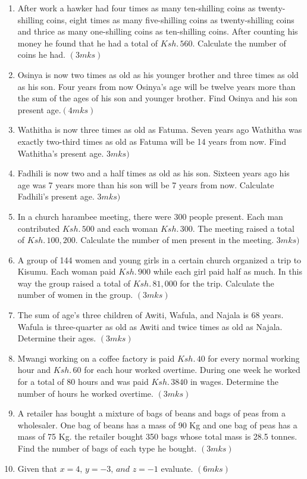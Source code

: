 \documentclass[
  a4paperpaper,
]{scrbook}
\begin{document}
\begin{tcolorbox}
\begin{enumerate}
\def\labelenumi{\arabic{enumi}.}
\setcounter{enumi}{11}
\item
  After work a hawker had four times as many ten-shilling coins as
  twenty-shilling coins, eight times as many five-shilling coins as
  twenty-shilling coins and thrice as many one-shilling coins as
  ten-shilling coins. After counting his money he found that he had a
  total of \(Ksh.\, 560\). Calculate the number of coins he had.
  \((3mks)\)
\item
  Osinya is now two times as old as his younger brother and three times
  as old as his son. Four years from now Osinya's age will be twelve
  years more than the sum of the ages of his son and younger brother.
  Find Osinya and his son present age.\((4mks)\)
\item
  Wathitha is now three times as old as Fatuma. Seven years ago Wathitha
  was exactly two-third times as old as Fatuma will be 14 years from
  now. Find Wathitha's present age. \(3mks)\)
\item
  Fadhili is now two and a half times as old as his son. Sixteen years
  ago his age was 7 years more than his son will be 7 years from now.
  Calculate Fadhili's present age. \(3mks)\)
\item
  In a church harambee meeting, there were 300 people present. Each man
  contributed \(Ksh. \,500\) and each woman \(Ksh.\, 300\). The meeting
  raised a total of \(Ksh.\, 100,200\). Calculate the number of men
  present in the meeting. \(3mks)\)
\item
  A group of 144 women and young girls in a certain church organized a
  trip to Kisumu. Each woman paid \(Ksh. \,900\) while each girl paid
  half as much. In this way the group raised a total of
  \(Ksh.\, 81,000\) for the trip. Calculate the number of women in the
  group. \((3mks)\)
\item
  The sum of age's three children of Awiti, Wafula, and Najala is 68
  years. Wafula is three-quarter as old as Awiti and twice times as old
  as Najala. Determine their ages. \((3mks)\)
\item
  Mwangi working on a coffee factory is paid \(Ksh.\, 40\) for every
  normal working hour and \(Ksh.\, 60\) for each hour worked overtime.
  During one week he worked for a total of 80 hours and was paid
  \(Ksh. \,3840\) in wages. Determine the number of hours he worked
  overtime. \((3mks)\)
\item
  A retailer has bought a mixture of bags of beans and bags of peas from
  a wholesaler. One bag of beans has a mass of 90 Kg and one bag of peas
  has a mass of 75 Kg. the retailer bought 350 bags whose total mass is
  28.5 tonnes. Find the number of bags of each type he bought.
  \((3mks)\)
\item
  Given that \(x=4,\, y= -3 ,\, and \,\,z= -1\) evaluate. \((6mks)\)


\end{enumerate}
\end{tcolorbox}
\end{document}
